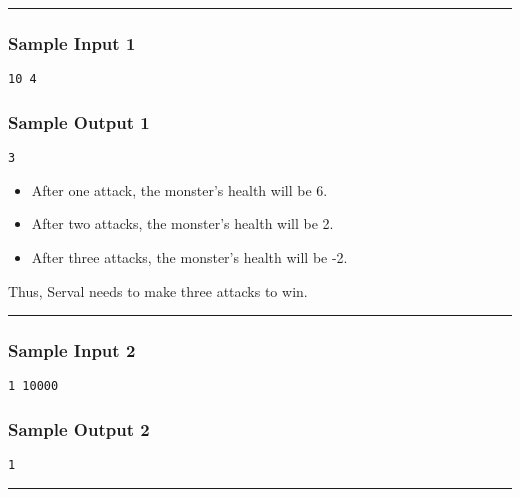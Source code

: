 \begin{center}\rule{0.5\linewidth}{\linethickness}\end{center}

\subsubsection{Sample Input 1}

\begin{verbatim}
10 4
\end{verbatim}

\subsubsection{Sample Output 1}

\begin{verbatim}
3
\end{verbatim}

\begin{itemize}
\tightlist
\item
  After one attack, the monster's health will be 6.
\item
  After two attacks, the monster's health will be 2.
\item
  After three attacks, the monster's health will be -2.
\end{itemize}

Thus, Serval needs to make three attacks to win.

\begin{center}\rule{0.5\linewidth}{\linethickness}\end{center}

\subsubsection{Sample Input 2}

\begin{verbatim}
1 10000
\end{verbatim}

\subsubsection{Sample Output 2}

\begin{verbatim}
1
\end{verbatim}

\begin{center}\rule{0.5\linewidth}{\linethickness}\end{center}


